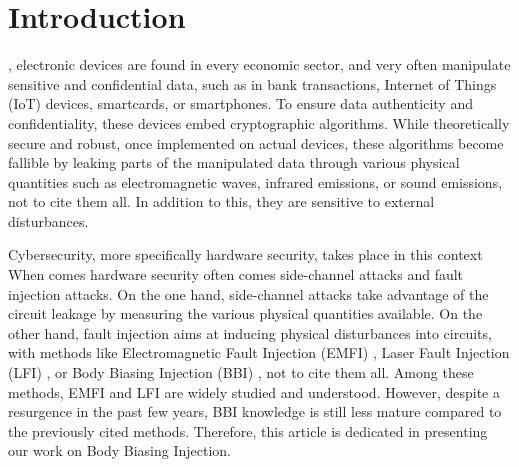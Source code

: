 
\section{Introduction}

	, electronic devices are found in every economic sector, and very often manipulate sensitive and confidential data, such as in bank transactions, Internet of Things (IoT) devices, smartcards, or smartphones.
	To ensure data authenticity and confidentiality, these devices embed cryptographic algorithms.
	While theoretically secure and robust, once implemented on actual devices, these algorithms become fallible by leaking parts of the manipulated data through various physical quantities such as electromagnetic waves, infrared emissions, or sound emissions, not to cite them all.
	In addition to this, they are sensitive to external disturbances.

	Cybersecurity, more specifically hardware security, takes place in this context
	When comes hardware security often comes side-channel attacks and fault injection attacks.
	On the one hand, side-channel attacks take advantage of the circuit leakage by measuring the various physical quantities available.
	On the other hand, fault injection aims at inducing physical disturbances into circuits, with methods like Electromagnetic Fault Injection (EMFI) \cite{mathieuEMFIFirst, mathieuEMFI}, Laser Fault Injection (LFI) \cite{lfiFaultModel}, or Body Biasing Injection (BBI) \cite{bbiOrigin}, not to cite them all.
	Among these methods, EMFI and LFI are widely studied and understood.
	However, despite a resurgence in the past few years, BBI knowledge is still less mature compared to the previously cited methods.
	Therefore, this article is dedicated in presenting our work on Body Biasing Injection.


